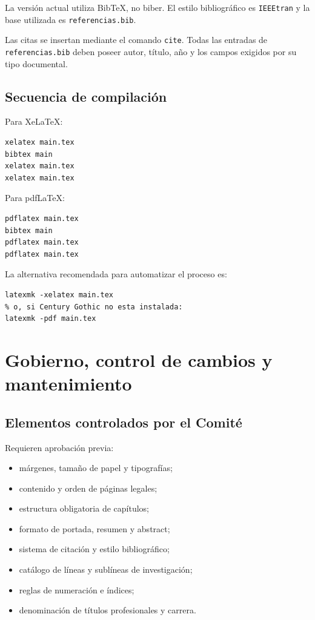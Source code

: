 \documentclass[12pt,a4paper,oneside]{report}
\begin{document}
La versión actual utiliza BibTeX, no biber. El estilo bibliográfico es \texttt{IEEEtran} y la base utilizada es \texttt{referencias.bib}.

Las citas se insertan mediante el comando \texttt{cite}. Todas las entradas de \texttt{referencias.bib} deben poseer autor, título, año y los campos exigidos por su tipo documental.

\section{Secuencia de compilación}

Para XeLaTeX:

\begin{lstlisting}
xelatex main.tex
bibtex main
xelatex main.tex
xelatex main.tex
\end{lstlisting}

Para pdfLaTeX:

\begin{lstlisting}
pdflatex main.tex
bibtex main
pdflatex main.tex
pdflatex main.tex
\end{lstlisting}

La alternativa recomendada para automatizar el proceso es:

\begin{lstlisting}
latexmk -xelatex main.tex
% o, si Century Gothic no esta instalada:
latexmk -pdf main.tex
\end{lstlisting}

\chapter{Gobierno, control de cambios y mantenimiento}

\section{Elementos controlados por el Comité}

Requieren aprobación previa:

\begin{itemize}
  \item márgenes, tamaño de papel y tipografías;
  \item contenido y orden de páginas legales;
  \item estructura obligatoria de capítulos;
  \item formato de portada, resumen y abstract;
  \item sistema de citación y estilo bibliográfico;
  \item catálogo de líneas y sublíneas de investigación;
  \item reglas de numeración e índices;
  \item denominación de títulos profesionales y carrera.
\end{itemize}
\end{document}
